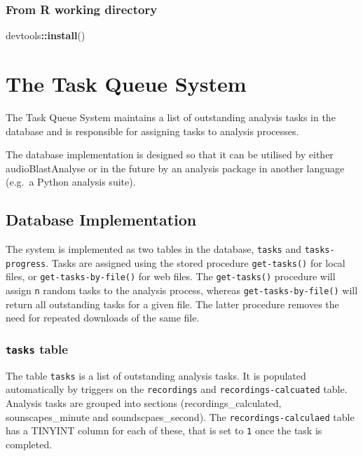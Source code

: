 \documentclass[
]{book}
\newenvironment{Shaded}{\begin{snugshade}}{\end{snugshade}}
\newcommand{\FunctionTok}[1]{\textcolor[rgb]{0.13,0.29,0.53}{\textbf{#1}}}
\newcommand{\NormalTok}[1]{#1}
\newcommand{\SpecialCharTok}[1]{\textcolor[rgb]{0.81,0.36,0.00}{\textbf{#1}}}
\begin{document}
\hypertarget{from-r-working-directory}{%
\subsection{From R working directory}\label{from-r-working-directory}}

\begin{Shaded}
\begin{Highlighting}[]
\NormalTok{devtools}\SpecialCharTok{::}\FunctionTok{install}\NormalTok{()}
\end{Highlighting}
\end{Shaded}

\hypertarget{the-task-queue-system}{%
\chapter{The Task Queue System}\label{the-task-queue-system}}

The Task Queue System maintains a list of outstanding analysis tasks in the database and is responsible for assigning tasks to analysis processes.

The database implementation is designed so that it can be utilised by either audioBlastAnalyse or in the future by an analysis package in another language (e.g.~a Python analysis suite).

\hypertarget{database-implementation}{%
\section{Database Implementation}\label{database-implementation}}

The system is implemented as two tables in the database, \texttt{tasks} and \texttt{tasks-progress}. Tasks are assigned using the stored procedure \texttt{get-tasks()} for local files, or \texttt{get-tasks-by-file()} for web files. The \texttt{get-tasks()} procedure will assign \texttt{n} random tasks to the analysis process, whereas \texttt{get-tasks-by-file()} will return all outstanding tasks for a given file. The latter procedure removes the need for repeated downloads of the same file.

\hypertarget{tasks-table}{%
\subsection{\texorpdfstring{\texttt{tasks} table}{tasks table}}\label{tasks-table}}

The table \texttt{tasks} is a list of outstanding analysis tasks. It is populated automatically by triggers on the \texttt{recordings} and \texttt{recordings-calcuated} table. Analysis tasks are grouped into sections (recordings\_calculated, sounscapes\_minute and soundscpaes\_second). The \texttt{recordings-calculaed} table has a TINYINT column for each of these, that is set to \texttt{1} once the task is completed.
\end{document}
